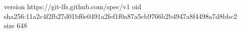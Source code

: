 version https://git-lfs.github.com/spec/v1
oid sha256:11a2c4f2fb27d01bf6e0491a2fef1f0a87a5cb9766b2b4947a8f4498a7d8bbc2
size 648

